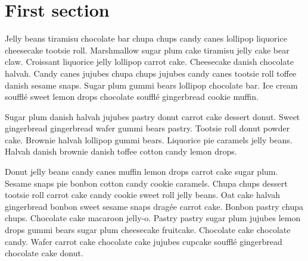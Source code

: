 \section{First section}
Jelly beans tiramisu chocolate bar chupa chups candy canes lollipop liquorice cheesecake tootsie roll. Marshmallow sugar plum cake tiramisu jelly cake bear claw. Croissant liquorice jelly lollipop carrot cake. Cheesecake danish chocolate halvah. Candy canes jujubes chupa chups jujubes candy canes tootsie roll toffee danish sesame snaps. Sugar plum gummi bears lollipop chocolate bar. Ice cream soufflé sweet lemon drops chocolate soufflé gingerbread cookie muffin.

Sugar plum danish halvah jujubes pastry donut carrot cake dessert donut. Sweet gingerbread gingerbread wafer gummi bears pastry. Tootsie roll donut powder cake. Brownie halvah lollipop gummi bears. Liquorice pie caramels jelly beans. Halvah danish brownie danish toffee cotton candy lemon drops.

Donut jelly beans candy canes muffin lemon drops carrot cake sugar plum. Sesame snaps pie bonbon cotton candy cookie caramels. Chupa chups dessert tootsie roll carrot cake candy cookie sweet roll jelly beans. Oat cake halvah gingerbread bonbon sweet sesame snaps dragée carrot cake. Bonbon pastry chupa chups. Chocolate cake macaroon jelly-o. Pastry pastry sugar plum jujubes lemon drops gummi bears sugar plum cheesecake fruitcake. Chocolate cake chocolate candy. Wafer carrot cake chocolate cake jujubes cupcake soufflé gingerbread chocolate cake donut.
